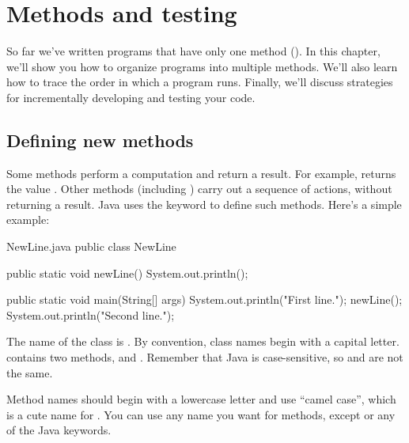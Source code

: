 \chapter{Methods and testing}

So far we've written programs that have only one method ().
In this chapter, we'll show you how to organize programs into multiple methods.
We'll also learn how to trace the order in which a program runs.
Finally, we'll discuss strategies for incrementally developing and testing your code.



\section{Defining new methods}
\label{adding_methods}



Some methods perform a computation and return a result.
For example,  returns the value .
Other methods (including ) carry out a sequence of actions, without returning a result.
Java uses the keyword  to define such methods.
Here's a simple example:

\begin{trinket}[310]{NewLine.java}
public class NewLine {

    public static void newLine() {
        System.out.println();
    }

    public static void main(String[] args) {
        System.out.println("First line.");
        newLine();
        System.out.println("Second line.");
    }
}
\end{trinket}


The name of the class is .
By convention, class names begin with a capital letter.
 contains two methods,  and .
Remember that Java is case-sensitive, so  and  are not the same.


Method names should begin with a lowercase letter and use ``camel case'', which is a cute name for .
You can use any name you want for methods, except  or any of the Java keywords.

